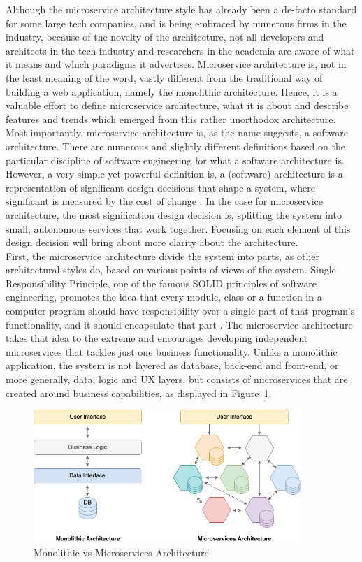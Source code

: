\documentclass{Configuration_Files/PoliMi3i_thesis}
\begin{document}
Although the microservice architecture style has already been a de-facto standard for some large tech companies, and is being embraced by numerous firms in the industry, because of the novelty of the architecture, not all developers and architects in the tech industry and researchers in the academia are aware of what it means and which paradigms it advertises.
Microservice architecture is, not in the least meaning of the word, vastly different from the traditional way of building a web application, namely the monolithic architecture.
Hence, it is a valuable effort to define microservice architecture, what it is about and describe features and trends which emerged from this rather unorthodox architecture.
\\
Most importantly, microservice architecture is, as the name suggests, a software architecture.
There are numerous and slightly different definitions based on the particular discipline of software engineering for what a software architecture is.
However, a very simple yet powerful definition is, a (software) architecture is a representation of significant design decisions that shape a system, where significant is measured by the cost of change \cite{booch}. 
In the case for microservice architecture, the most signification design decision is, splitting the system into small, autonomous services that work together.
Focusing on each element of this design decision will bring about more clarity about the architecture.
\\
First, the microservice architecture divide the system into parts, as other architectural styles do, based on various points of views of the system.
Single Responsibility Principle, one of the famous SOLID principles of software engineering, promotes the idea that every module, class or a function in a computer program should have responsibility over a single part of that program's functionality, and it should encapsulate that part \cite{srp}.
The microservice architecture takes that idea to the extreme and encourages developing independent microservices that tackles just one business functionality.
Unlike a monolithic application, the system is not layered as database, back-end and front-end, or more generally, data, logic and UX layers, but consists of microservices that are created around business capabilities, as displayed in Figure~\ref{fig:monovsmicro}.

\begin{figure}[H]
    \centering
    \includegraphics[width=0.9\textwidth]{myImages/monovsmicro.png}
    \caption{Monolithic vs Microservices Architecture}
    \label{fig:monovsmicro}
\end{figure}
\end{document}
